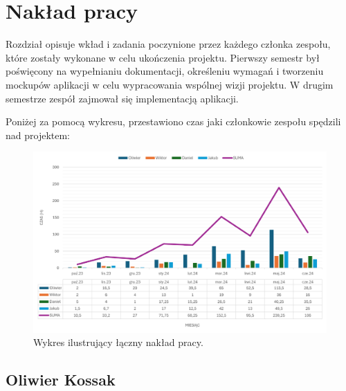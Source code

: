\chapter{Nakład pracy}

Rozdział opisuje wkład i zadania poczynione przez każdego członka zespołu, które zostały wykonane w celu ukończenia projektu. Pierwszy semestr był poświęcony na wypełnianiu dokumentacji, określeniu wymagań i tworzeniu mockupów aplikacji w celu wypracowania wspólnej wizji projektu. W drugim semestrze zespół zajmował się implementacją aplikacji.

\indent Poniżej za pomocą wykresu, przestawiono czas jaki członkowie zespołu spędzili nad projektem:

\begin{figure}[H]
    \centering
    \includegraphics[width=1\textwidth]{chapters/chapter_11/naklad_pracy_wykres}
    \caption{Wykres ilustrujący łączny nakład pracy.}
    \label{img:wykres_nakładu_pracy}
\end{figure}

\section{Oliwier Kossak}

